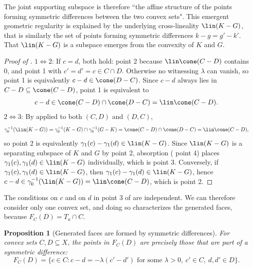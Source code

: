 \documentclass{article}
\theoremstyle{plain}
\newtheorem{proposition}[proposition]{Proposition}
\theoremstyle{definition}
\theoremstyle{remark}
\begin{document}
The joint supporting subspace is therefore ``the affine structure of the points forming symmetric differences between the two convex sets".
This emergent geometric regularity is explained by the underlying cross-lineality $\lin(K-G)$, that is similarly the set of points forming symmetric differences $k-g=g'-k'$. That 
$\lin(K-G)$ is a subspace emerges from the convexity of $K$ and $G$.
\begin{proof}[\hypertarget{loc:pairs_forming_symmetric_differences.proof}{}Proof of ]

$1 \iff 2$: If $c = d$, both hold: point 2 because $\lin\cone(C-D)$ contains $0$, and point 1 with $c' = d' = c \in C \cap D$. Otherwise no witnessing $\lambda$ can vanish, so point 1 is equivalently $c-d \in \cone(D-C)$. Since $c-d$ always lies in $C - D \subseteq \cone(C-D)$, point 1 is equivalent to
\begin{equation*}
c-d \in \cone(C-D) \cap \cone(D-C) = \lin\cone(C-D).
\end{equation*}
$2 \iff 3$: By  applied to both $(C,D)$ and $(D,C)$,
\begin{equation*}
\gamma_0^{-1}(\lin(K-G)) = \gamma_0^{-1}(K-G) \cap \gamma_0^{-1}(G-K) = \cone(C-D) \cap \cone(D-C) = \lin\cone(C-D),
\end{equation*}
so point 2 is equivalently $\gamma_1(c) - \gamma_1(d) \in \lin(K-G)$. Since $\lin(K-G)$ is a separating subspace of $K$ and $G$ by  point 2, absorption ( point 4) places $\gamma_1(c), \gamma_1(d) \in \lin(K-G)$ individually, which is point 3. Conversely, if $\gamma_1(c), \gamma_1(d) \in \lin(K-G)$, then
$\gamma_1(c) - \gamma_1(d)  \in \lin(K-G)$, hence $c-d  \in \gamma_0^{-1}(\lin(K-G)) = \lin \cone(C-D)$,
which is point 2.
\end{proof}
The conditions on $c$ and on $d$ in point 3 of  are independent. We can therefore consider only one convex set, and doing so characterizes the generated faces, because $F_C(D)= T_a \cap C$.
\begin{proposition}[Generated faces are formed by symmetric differences]
\label{loc:generated_faces_are_formed_by_symmetric_differences.statement}
For convex sets $C, D \subseteq X$, the points in $F_C(D)$ are precisely those that are part of a symmetric difference:
\begin{equation*}
F_C(D) = \{c \in C : c-d = -\lambda(c'-d') \text{ for some } \lambda > 0,\ c' \in C,\ d, d' \in D\}.
\end{equation*}
\end{proposition}
\end{document}
